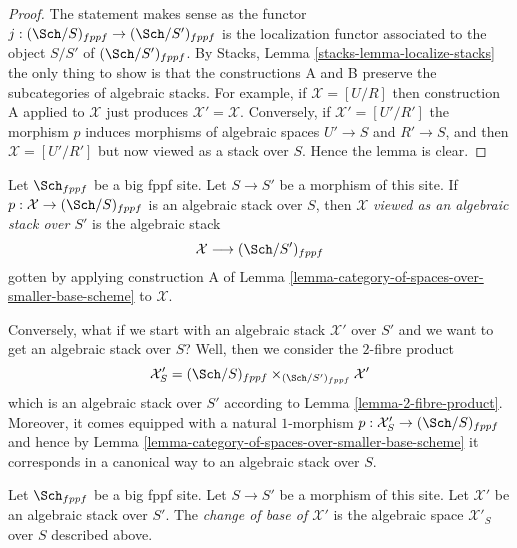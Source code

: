 \begin{proof}
The statement makes sense as the functor
$j : (\Sch/S)_{fppf} \to (\Sch/S')_{fppf}$
is the localization functor associated to the object $S/S'$
of $(\Sch/S')_{fppf}$. By
Stacks, Lemma \ref{stacks-lemma-localize-stacks}
the only thing to show is that the constructions A and B
preserve the subcategories of algebraic stacks.
For example, if $\mathcal{X} = [U/R]$ then construction A
applied to $\mathcal{X}$ just produces
$\mathcal{X}' = \mathcal{X}$. Conversely, if $\mathcal{X}' = [U'/R']$
the morphism $p$ induces morphisms of algebraic spaces
$U' \to S$ and $R' \to S$, and then $\mathcal{X} = [U'/R']$
but now viewed as a stack over $S$. Hence the lemma is clear.
\end{proof}

\begin{definition}
\label{definition-viewed-as}
Let $\Sch_{fppf}$ be a big fppf site.
Let $S \to S'$ be a morphism of this site.
If $p : \mathcal{X} \to (\Sch/S)_{fppf}$
is an algebraic stack over $S$, then
$\mathcal{X}$ {\it viewed as an algebraic stack over $S'$}
is the algebraic stack
$$
\mathcal{X} \longrightarrow (\Sch/S')_{fppf}
$$
gotten by applying construction A of
Lemma \ref{lemma-category-of-spaces-over-smaller-base-scheme}
to $\mathcal{X}$.
\end{definition}

\noindent
Conversely, what if we start with an algebraic stack $\mathcal{X}'$
over $S'$ and we want to get an algebraic stack over $S$?
Well, then we consider the $2$-fibre product
$$
\mathcal{X}'_S
=
(\Sch/S)_{fppf} \times_{(\Sch/S')_{fppf}} \mathcal{X}'
$$
which is an algebraic stack over $S'$ according to
Lemma \ref{lemma-2-fibre-product}.
Moreover, it comes equipped with a natural $1$-morphism
$p : \mathcal{X}'_S \to (\Sch/S)_{fppf}$ and hence by
Lemma \ref{lemma-category-of-spaces-over-smaller-base-scheme}
it corresponds in a canonical way to an algebraic stack over $S$.

\begin{definition}
\label{definition-change-of-base}
Let $\Sch_{fppf}$ be a big fppf site.
Let $S \to S'$ be a morphism of this site.
Let $\mathcal{X}'$ be an algebraic stack over $S'$.
The {\it change of base of $\mathcal{X}'$} is the
algebraic space $\mathcal{X}'_S$ over $S$ described above.
\end{definition}










